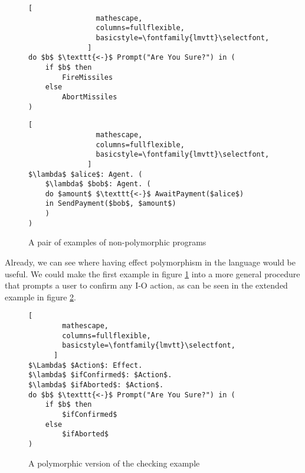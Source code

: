 \documentclass{Report}
\begin{document}
\begin{figure}
    \centering
    \begin{minipage}{0.45\textwidth}
        \begin{framed}
            \begin{lstlisting}[
                mathescape,
                columns=fullflexible,
                basicstyle=\fontfamily{lmvtt}\selectfont,
              ]
do $b$ $\texttt{<-}$ Prompt("Are You Sure?") in (
    if $b$ then
        FireMissiles
    else
        AbortMissiles
)
            \end{lstlisting}        
        \end{framed}
    \end{minipage}
    \quad
    \begin{minipage}{0.45\textwidth}
        \begin{framed}
            \begin{lstlisting}[
                mathescape,
                columns=fullflexible,
                basicstyle=\fontfamily{lmvtt}\selectfont,
              ]
$\lambda$ $alice$: Agent. (
    $\lambda$ $bob$: Agent. (
    do $amount$ $\texttt{<-}$ AwaitPayment($alice$)
    in SendPayment($bob$, $amount$)
    )
)
              \end{lstlisting}
        \end{framed}
    \end{minipage}
    \caption{A pair of examples of non-polymorphic programs}
    \label{CheckExample}
\end{figure}



Already, we can see where having effect polymorphism in the language would be useful. We could make the first example in figure \ref{CheckExample} into a more general procedure that prompts a user to confirm any I-O action, as can be seen in the extended example in figure \ref{PolymorphicCheckExample}.

\begin{figure}
\begin{framed}
    \begin{lstlisting}[
        mathescape,
        columns=fullflexible,
        basicstyle=\fontfamily{lmvtt}\selectfont,
      ]
$\Lambda$ $Action$: Effect. 
$\lambda$ $ifConfirmed$: $Action$.
$\lambda$ $ifAborted$: $Action$.
do $b$ $\texttt{<-}$ Prompt("Are You Sure?") in (
    if $b$ then 
        $ifConfirmed$ 
    else
        $ifAborted$
)
    \end{lstlisting}        
\end{framed}
\caption{A polymorphic version of the checking example}
\label{PolymorphicCheckExample}
\end{figure}
\end{document}

